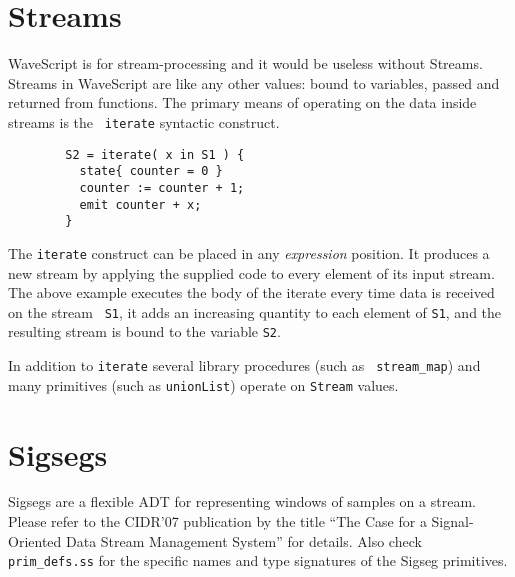 \documentclass[twocolumn]{report}
\begin{document}
\section{Streams}

WaveScript is for stream-processing and it would be useless without
Streams.  
Streams in WaveScript are like any other values: bound to variables,
passed and returned from functions.
The primary means of operating on the data inside streams is the {\tt
  iterate} syntactic construct.

\begin{verbatim}
        S2 = iterate( x in S1 ) {
          state{ counter = 0 }
          counter := counter + 1;
          emit counter + x;
        }
\end{verbatim}

The {\tt iterate} construct can be placed in any {\em expression}
position.  It produces a new stream by applying the supplied code to
every element of its input stream.  The above example executes the
body of the iterate every time data is received on the stream {\tt
  S1}, it adds an increasing quantity to each element of {\tt S1}, and the
resulting stream is bound to the variable {\tt S2}.

In addition to {\tt iterate} several library procedures (such as {\tt
stream\_map}) and many primitives (such as {\tt unionList}) operate on
{\tt Stream} values.





\section{Sigsegs}

Sigsegs are a flexible ADT for representing windows of samples on a stream.
Please refer to the CIDR'07 publication by the title 
``The Case for a Signal-Oriented Data Stream Management System'' for
details.  Also check {\tt prim\_defs.ss} for the specific names and
type signatures of the Sigseg primitives.






  
\end{document}
